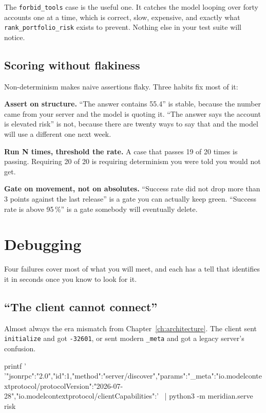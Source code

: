 The \texttt{forbid\_tools} case is the useful one. It catches the model looping
over forty accounts one at a time, which is correct, slow, expensive, and exactly
what \texttt{rank\_portfolio\_risk} exists to prevent. Nothing else in your test
suite will notice.

\subsection{Scoring without flakiness}

Non-determinism makes naive assertions flaky. Three habits fix most of it:

\textbf{Assert on structure.} ``The answer contains 55.4'' is stable, because the
number came from your server and the model is quoting it. ``The answer says the
account is elevated risk'' is not, because there are twenty ways to say that and
the model will use a different one next week.

\textbf{Run N times, threshold the rate.} A case that passes 19 of 20 times is
passing. Requiring 20 of 20 is requiring determinism you were told you would not
get.

\textbf{Gate on movement, not on absolutes.} ``Success rate did not drop more
than 3 points against the last release'' is a gate you can actually keep green.
``Success rate is above 95\,\%'' is a gate somebody will eventually delete.

\section{Debugging}

Four failures cover most of what you will meet, and each has a tell that
identifies it in seconds once you know to look for it.

\subsection{``The client cannot connect''}

Almost always the era mismatch from Chapter~\ref{ch:architecture}. The client
sent \texttt{initialize} and got \texttt{-32601}, or sent modern
\texttt{\_meta} and got a legacy server's confusion.

\begin{sh}
printf '%
 '{"jsonrpc":"2.0","id":1,"method":"server/discover","params":{"_meta":{"io.modelcontextprotocol/protocolVersion":"2026-07-28","io.modelcontextprotocol/clientCapabilities":{}}}}' \
 | python3 -m meridian.serve risk
\end{sh}

